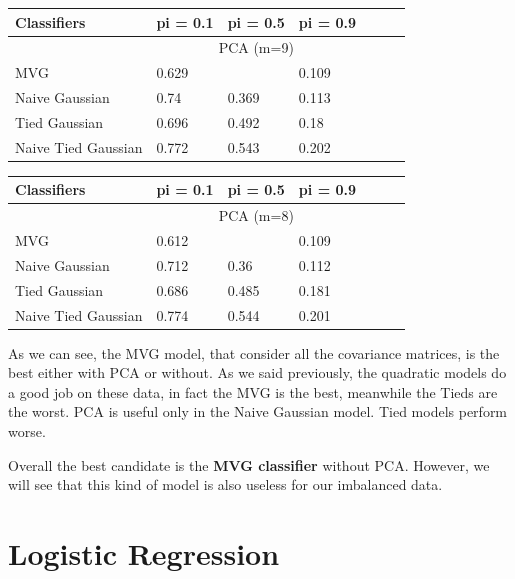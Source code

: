 \documentclass[english]{report}
\begin{document}
\begin{table}[H]
    \centering
    \begin{tabular}{@{}lllllll@{}}
    \toprule
    Classifiers         & pi = 0.1 & pi = 0.5 & pi = 0.9 \\ \midrule
                        & \multicolumn{3}{c}{PCA (m=9)}  \\ \midrule
    MVG                 & 0.629    & \color{red}{0.33}    & 0.109    \\
    Naive Gaussian      & 0.74    & 0.369    & 0.113    \\
    Tied Gaussian       & 0.696    & 0.492    & 0.18    \\
    Naive Tied Gaussian & 0.772    & 0.543    & 0.202    \\ \bottomrule
    \end{tabular}
    \label{tab:MVG_PCA9_valid}
\end{table}

\begin{table}[H]
    \centering
    \begin{tabular}{@{}lllllll@{}}
    \toprule
    Classifiers         & pi = 0.1 & pi = 0.5 & pi = 0.9 \\ \midrule
                        & \multicolumn{3}{c}{PCA (m=8)}  \\ \midrule
    MVG                 & 0.612    & \color{red}{0.333}    & 0.109    \\
    Naive Gaussian      & 0.712     & 0.36    & 0.112    \\
    Tied Gaussian       & 0.686    & 0.485    & 0.181    \\
    Naive Tied Gaussian & 0.774    & 0.544    & 0.201    \\ \bottomrule
    \end{tabular}
    \label{tab:MVG_PCA8_valid}
\end{table}

As we can see, the MVG model, that consider all the covariance matrices, is the best either with PCA or without.
As we said previously, the quadratic models do a good job on these data, in fact the MVG is the best, meanwhile the Tieds are the worst.
PCA is useful only in the Naive Gaussian model.
Tied models perform worse.

Overall the best candidate is the \textbf{MVG classifier} without PCA. However, we will see that this kind of model is also
useless for our imbalanced data.

\clearpage

\section{Logistic Regression}
\end{document}

